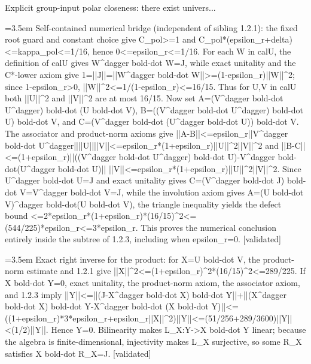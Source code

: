 \documentclass{article}
\newcommand{\step}[1]{\par\noindent\hangindent=3.5em\hangafter=1%
  \makebox[3.5em][l]{\textbf{#1.}}}
\newcommand{\steptag}[1]{\hfill{\small\textsf{[#1]}}}
\begin{document}
\begin{proofbox}{Explicit group-input polar closeness: there exist univers...}
\step{1.2.3.1} Self-contained numerical bridge (independent of sibling 1.2.1): the fixed root guard and constant choice give C\_pol>=1 and C\_pol*(epsilon\_r+delta)<=kappa\_pol<=1/16, hence 0<=epsilon\_r<=1/16. For each W in calU, the definition of calU gives W\textasciicircum{}dagger bold-dot W=J, while exact unitality and the C*-lower axiom give 1=||J||=||W\textasciicircum{}dagger bold-dot W||>=(1-epsilon\_r)||W||\textasciicircum{}2; since 1-epsilon\_r>0, ||W||\textasciicircum{}2<=1/(1-epsilon\_r)<=16/15. Thus for U,V in calU both ||U||\textasciicircum{}2 and ||V||\textasciicircum{}2 are at most 16/15. Now set A=(V\textasciicircum{}dagger bold-dot U\textasciicircum{}dagger) bold-dot (U bold-dot V), B=((V\textasciicircum{}dagger bold-dot U\textasciicircum{}dagger) bold-dot U) bold-dot V, and C=(V\textasciicircum{}dagger bold-dot (U\textasciicircum{}dagger bold-dot U)) bold-dot V. The associator and product-norm axioms give ||A-B||<=epsilon\_r||V\textasciicircum{}dagger bold-dot U\textasciicircum{}dagger||||U||||V||<=epsilon\_r*(1+epsilon\_r)||U||\textasciicircum{}2||V||\textasciicircum{}2 and ||B-C||<=(1+epsilon\_r)||((V\textasciicircum{}dagger bold-dot U\textasciicircum{}dagger) bold-dot U)-V\textasciicircum{}dagger bold-dot(U\textasciicircum{}dagger bold-dot U)|| ||V||<=epsilon\_r*(1+epsilon\_r)||U||\textasciicircum{}2||V||\textasciicircum{}2. Since U\textasciicircum{}dagger bold-dot U=J and exact unitality gives C=(V\textasciicircum{}dagger bold-dot J) bold-dot V=V\textasciicircum{}dagger bold-dot V=J, while the involution axiom gives A=(U bold-dot V)\textasciicircum{}dagger bold-dot(U bold-dot V), the triangle inequality yields the defect bound <=2*epsilon\_r*(1+epsilon\_r)*(16/15)\textasciicircum{}2<=(544/225)*epsilon\_r<=3*epsilon\_r. This proves the numerical conclusion entirely inside the subtree of 1.2.3, including when epsilon\_r=0. \steptag{validated} \\[4pt]
\step{1.2.4} Exact right inverse for the product: for X=U bold-dot V, the product-norm estimate and 1.2.1 give ||X||\textasciicircum{}2<=(1+epsilon\_r)\textasciicircum{}2*(16/15)\textasciicircum{}2<=289/225. If X bold-dot Y=0, exact unitality, the product-norm axiom, the associator axiom, and 1.2.3 imply ||Y||<=||(J-X\textasciicircum{}dagger bold-dot X) bold-dot Y||+||(X\textasciicircum{}dagger bold-dot X) bold-dot Y-X\textasciicircum{}dagger bold-dot (X bold-dot Y)||<=((1+epsilon\_r)*3*epsilon\_r+epsilon\_r||X||\textasciicircum{}2)||Y||<=(51/256+289/3600)||Y||<(1/2)||Y||. Hence Y=0. Bilinearity makes L\_X:Y->X bold-dot Y linear; because the algebra is finite-dimensional, injectivity makes L\_X surjective, so some R\_X satisfies X bold-dot R\_X=J. \steptag{validated} \\[4pt]

\end{proofbox}
\end{document}
